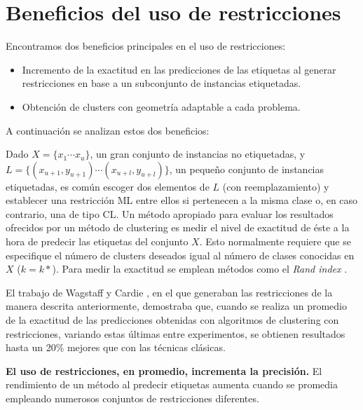 \section{Beneficios del uso de restricciones}

Encontramos dos beneficios principales en el uso de restricciones: 

\begin{itemize}
	
	\item Incremento de la exactitud en las predicciones de las etiquetas al generar restricciones en base a un subconjunto de instancias etiquetadas.
	
	\item Obtención de clusters con geometría adaptable a cada problema.
	
\end{itemize}

A continuación se analizan estos dos beneficios:

Dado $X = \{x_1 \cdots x_u\}$, un gran conjunto de instancias no etiquetadas, y $L = \{(x_{u+1}, y_{u+1})\cdots (x_{u+l}, y_{u+l})\}$, un pequeño conjunto de instancias etiquetadas, es común escoger dos elementos de $L$ (con reemplazamiento) y establecer una restricción \acs{ML} entre ellos si pertenecen a la misma clase o, en caso contrario, una de tipo \acs{CL}. Un método apropiado para evaluar los resultados ofrecidos por un método de clustering es medir el nivel de exactitud de éste a la hora de predecir las etiquetas del conjunto $X$. Esto normalmente requiere que se especifique el número de clusters deseados igual al número de clases conocidas en $X$ ($k = k*$). Para medir la exactitud se emplean métodos como el \textit{Rand index} \cite{Rand:1971}.

El trabajo de Wagstaff y Cardie \cite{WagstaffCardie:2000}, en el que generaban las restricciones de la manera descrita anteriormente, demostraba que, cuando se realiza un promedio de la exactitud de las predicciones obtenidas con algoritmos de clustering con restricciones, variando estas últimas entre experimentos, se obtienen resultados hasta un 20\% mejores que con las técnicas clásicas.

\begin{observacion}
	
	\textbf{El uso de restricciones, en promedio, incrementa la precisión.}
	El rendimiento de un método al predecir etiquetas aumenta cuando se promedia empleando numerosos conjuntos de restricciones diferentes. \cite{Survey:2007}
	\label{ob:observacion33}
	
\end{observacion}


